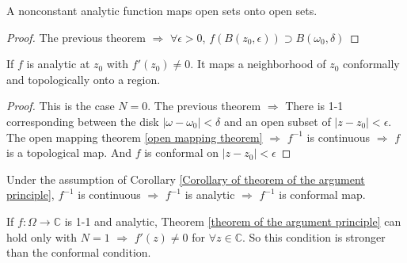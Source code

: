 \begin{corollary}\label{open mapping theorem}
    A nonconstant analytic function maps open sets onto open sets.
\end{corollary}
\begin{proof}
    The previous theorem  $ \Rightarrow $ $ \forall \epsilon>0 $,  $ f(B(z_0,\epsilon))\supset B(\omega_0,\delta) $   
\end{proof}
\begin{corollary}\label{Corollary of theorem of the argument principle}
    If  $ f $ is analytic at  $ z_0 $ with  $ f'(z_0)\neq 0 $. It maps a neighborhood of  $ z_0 $ conformally and topologically onto a region.   
\end{corollary}
\begin{proof}
    This is the case  $ N=0 $. The previous theorem  $ \Rightarrow  $ There is 1-1 corresponding between the disk  $ |\omega-\omega_0|<\delta $ and an open subset of  $ |z-z_0|<\epsilon $. The open mapping theorem \ref{open mapping theorem} $ \Rightarrow $  $ f^{-1} $ is continuous  $ \Rightarrow  $ $ f $ is a topological map. And  
    $ f $ is conformal  on  $ |z-z_0|<\epsilon $ 
\end{proof}
\begin{remark}
    Under the assumption of Corollary \ref{Corollary of theorem of the argument principle},  $ f^{-1} $ is continuous  $ \Rightarrow  $ $ f^{-1} $ is analytic $ \Rightarrow $ $ f^{-1} $ is conformal map.  
    
    If  $ f:\Omega\rightarrow \mathbb{C} $ is 1-1 and analytic,  Theorem \ref{theorem of the argument principle} can hold only with  $ N=1 $ $ \Rightarrow $ $ f'(z)\neq 0 $ for  $ \forall z\in\mathbb{C} $. So this condition is stronger than the conformal condition.    
\end{remark}
